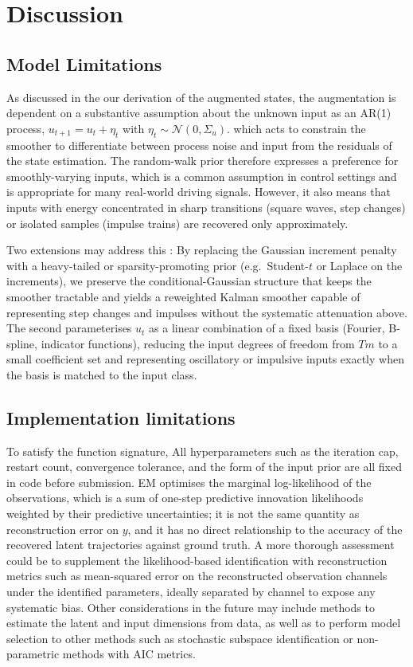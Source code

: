 \documentclass[11pt,a4paper]{article}
\begin{document}
\section{Discussion}
\subsection{Model Limitations}
As discussed in the our derivation of the augmented states, the augmentation is dependent on a substantive assumption
about the unknown input as an AR(1) process,
$u_{t+1} = u_t + \eta_t$ with $\eta_t \sim \mathcal{N}(0, \Sigma_u)$.
which acts to constrain the smoother to differentiate between process noise
and input from the residuals of the state estimation. The random-walk prior therefore
expresses a preference for smoothly-varying inputs, which is a common assumption in control settings and is appropriate for many real-world driving signals. However, it also means that inputs with energy concentrated in sharp transitions (square waves, step changes) or isolated samples (impulse trains) are recovered only approximately. 

Two extensions may address this : By replacing the Gaussian
increment penalty with a heavy-tailed or sparsity-promoting prior
(e.g.\ Student-$t$ or Laplace on the increments), we preserve the
conditional-Gaussian structure that keeps the smoother tractable and
yields a reweighted Kalman smoother capable of representing step
changes and impulses without the systematic attenuation above. The
second parameterises $u_t$ as a linear combination of a fixed basis
(Fourier, B-spline, indicator functions), reducing the input degrees of
freedom from $Tm$ to a small coefficient set and representing
oscillatory or impulsive inputs exactly when the basis is matched to
the input class.

\subsection{Implementation limitations}
To satisfy the function signature, All hyperparameters such as the iteration cap, restart count, convergence tolerance, and the form of the input prior are all fixed in code before submission. 
EM optimises the marginal log-likelihood of the observations,
which is a sum of one-step predictive innovation likelihoods weighted
by their predictive uncertainties; it is not the same quantity as
reconstruction error on $y$, and it has no direct relationship to the
accuracy of the recovered latent trajectories against ground truth.
A more thorough assessment could be to supplement the likelihood-based
identification with reconstruction metrics such as mean-squared error on
the reconstructed observation channels under the identified parameters,
ideally separated by channel to expose any systematic bias. Other considerations in the future may include methods
to estimate the latent and input dimensions from data, as well as to perform model selection to other methods such as stochastic subspace identification or non-parametric methods with AIC metrics.
\end{document}
